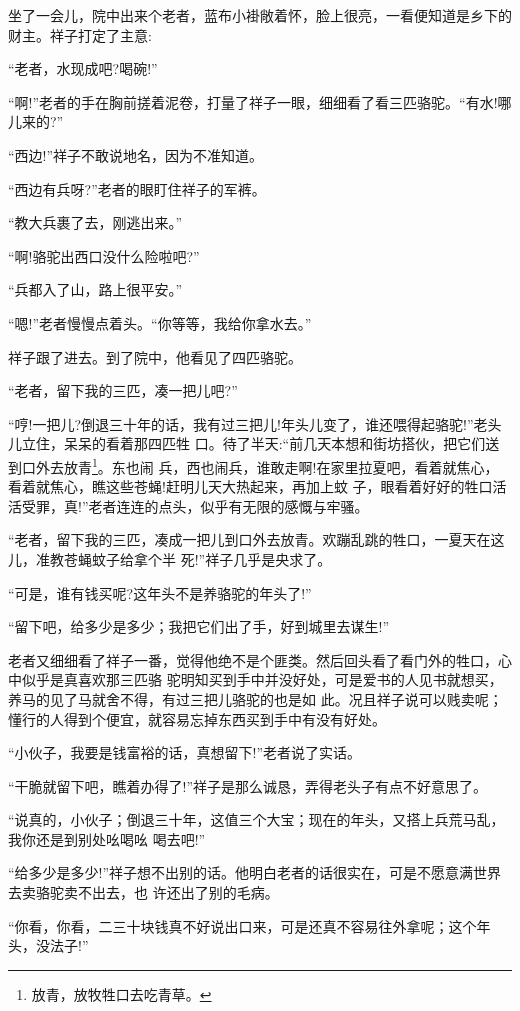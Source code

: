 \documentclass[11pt,a4paper,onecolumn]{article}
\begin{document}
坐了一会儿，院中出来个老者，蓝布小褂敞着怀，脸上很亮，一看便知道是乡下的财主。祥子打定了主意:

``老者，水现成吧?喝碗!''

``啊!''老者的手在胸前搓着泥卷，打量了祥子一眼，细细看了看三匹骆驼。``有水!哪儿来的?''

``西边!''祥子不敢说地名，因为不准知道。

``西边有兵呀?''老者的眼盯住祥子的军裤。

``教大兵裹了去，刚逃出来。''

``啊!骆驼出西口没什么险啦吧?''

``兵都入了山，路上很平安。''

``嗯!''老者慢慢点着头。``你等等，我给你拿水去。''

祥子跟了进去。到了院中，他看见了四匹骆驼。

``老者，留下我的三匹，凑一把儿吧?''

``哼!一把儿?倒退三十年的话，我有过三把儿!年头儿变了，谁还喂得起骆驼!''老头儿立住，呆呆的看着那四匹牲
口。待了半天:``前几天本想和街坊搭伙，把它们送到口外去放青\footnote{放青，放牧牲口去吃青草。}。东也闹
兵，西也闹兵，谁敢走啊!在家里拉夏吧，看着就焦心，看着就焦心，瞧这些苍蝇!赶明儿天大热起来，再加上蚊
子，眼看着好好的牲口活活受罪，真!''老者连连的点头，似乎有无限的感慨与牢骚。

``老者，留下我的三匹，凑成一把儿到口外去放青。欢蹦乱跳的牲口，一夏天在这儿，准教苍蝇蚊子给拿个半
死!''祥子几乎是央求了。

``可是，谁有钱买呢?这年头不是养骆驼的年头了!''

``留下吧，给多少是多少；我把它们出了手，好到城里去谋生!''

老者又细细看了祥子一番，觉得他绝不是个匪类。然后回头看了看门外的牲口，心中似乎是真喜欢那三匹骆
驼\myrule 明知买到手中并没好处，可是爱书的人见书就想买，养马的见了马就舍不得，有过三把儿骆驼的也是如
此。况且祥子说可以贱卖呢；懂行的人得到个便宜，就容易忘掉东西买到手中有没有好处。

``小伙子，我要是钱富裕的话，真想留下!''老者说了实话。

``干脆就留下吧，瞧着办得了!''祥子是那么诚恳，弄得老头子有点不好意思了。

``说真的，小伙子；倒退三十年，这值三个大宝；现在的年头，又搭上兵荒马乱，我\myrule 你还是到别处吆喝吆
喝去吧!''

``给多少是多少!''祥子想不出别的话。他明白老者的话很实在，可是不愿意满世界去卖骆驼\myrule 卖不出去，也
许还出了别的毛病。

``你看，你看，二三十块钱真不好说出口来，可是还真不容易往外拿呢；这个年头，没法子!''
\end{document}
